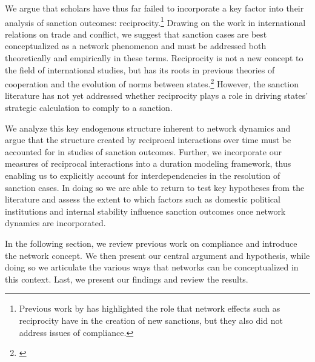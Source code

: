 We argue that scholars have thus far failed to incorporate a key factor into their analysis of sanction outcomes: reciprocity.\footnote{Previous work by \cite{cranmer2014reciprocity} has highlighted the role that network effects such as reciprocity have in the creation of new sanctions, but they also did not address issues of compliance.} Drawing on the work in international relations on trade and conflict, we suggest that sanction cases are best conceptualized as a network phenomenon and must be addressed both theoretically and empirically in these terms. Reciprocity is not a new concept to the field of international studies, but has its roots in previous theories of cooperation and the evolution of norms between states.\footnote{\cite{richardsonai:1960,choucri:north:1972,goldstein1991reciprocity,rajmaira1990evolving,ward1992reciprocity}} However, the sanction literature has not yet addressed whether reciprocity plays a role in driving states' strategic calculation to comply to a sanction. 

We analyze this key endogenous structure inherent to network dynamics and argue that the structure created by reciprocal interactions over time must be accounted for in studies of sanction outcomes. Further, we incorporate our measures of reciprocal interactions into a duration modeling framework, thus enabling us to explicitly account for interdependencies in the resolution of sanction cases. In doing so we are able to return to test key hypotheses from the literature and assess the extent to which factors such as domestic political institutions and internal stability influence sanction outcomes once network dynamics are incorporated.  

In the following section, we review previous work on compliance and introduce the network concept. We then present our central argument and hypothesis, while doing so we articulate the various ways that networks can be conceptualized in this context. Last, we present our findings and review the results.
